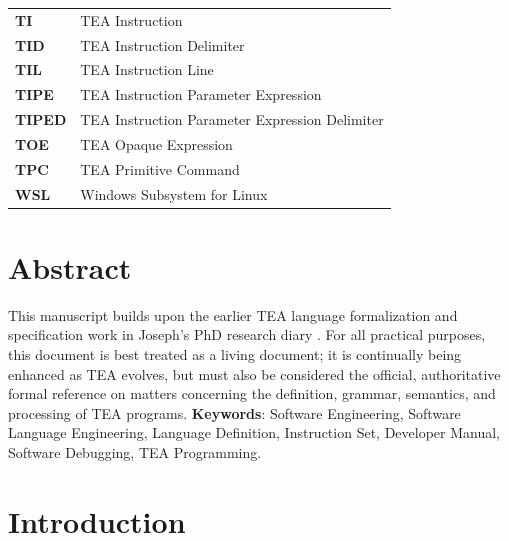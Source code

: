 \documentclass[a4paper, 18pt]{book} %
\begin{document}
\begin{longtable}{p{3cm} p{12cm}}
\textbf{TI} & TEA Instruction\\
 
\textbf{TID} & TEA Instruction Delimiter\\
 
\textbf{TIL} & TEA Instruction Line\\

\textbf{TIPE} & TEA Instruction Parameter Expression\\

\textbf{TIPED} & TEA Instruction Parameter Expression Delimiter\\

\textbf{TOE} & TEA Opaque Expression\\

\textbf{TPC} & TEA Primitive Command\\

\textbf{WSL} & Windows Subsystem for Linux\\




\end{longtable}





\mainmatter

\chapter*{Abstract}
\large

This manuscript builds upon the earlier TEA language formalization and specification work in Joseph’s PhD research diary \cite{lutalo2024tea}. For all practical purposes, this document is best treated as a living document; it is continually being enhanced as TEA evolves, but must also be considered the official, authoritative formal reference on matters concerning the definition, grammar, semantics, and processing of TEA programs. 
     \newline\newline
     \textbf{Keywords}: Software Engineering, Software Language Engineering, Language Definition, Instruction Set, Developer Manual, Software Debugging, TEA Programming.

\newpage

\chapter{Introduction}
\label{SEC1}
\end{document}
